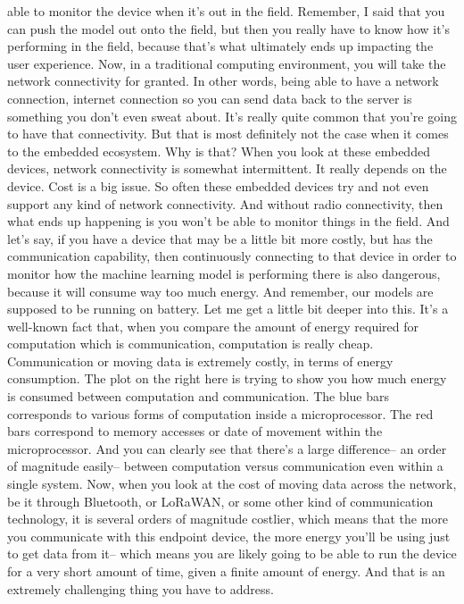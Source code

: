 able to monitor the device when it's out in the field.
Remember, I said that you can push the model out onto the field,
but then you really have to know how it's performing in the field,
because that's what ultimately ends up impacting the user experience.
Now, in a traditional computing environment,
you will take the network connectivity for granted.
In other words, being able to have a network connection, internet connection
so you can send data back to the server is
something you don't even sweat about.
It's really quite common that you're going to have that connectivity.
But that is most definitely not the case when
it comes to the embedded ecosystem.
Why is that?
When you look at these embedded devices, network connectivity
is somewhat intermittent.
It really depends on the device.
Cost is a big issue.
So often these embedded devices try and not even support
any kind of network connectivity.
And without radio connectivity, then what ends up happening
is you won't be able to monitor things in the field.
And let's say, if you have a device that may be a little bit more costly,
but has the communication capability, then continuously connecting
to that device in order to monitor how the machine learning model is
performing there is also dangerous, because it
will consume way too much energy.
And remember, our models are supposed to be running on battery.
Let me get a little bit deeper into this.
It's a well-known fact that, when you compare
the amount of energy required for computation which is communication,
computation is really cheap.
Communication or moving data is extremely costly,
in terms of energy consumption.
The plot on the right here is trying to show you
how much energy is consumed between computation and communication.
The blue bars corresponds to various forms
of computation inside a microprocessor.
The red bars correspond to memory accesses or date of movement
within the microprocessor.
And you can clearly see that there's a large difference--
an order of magnitude easily-- between computation versus communication
even within a single system.
Now, when you look at the cost of moving data across the network,
be it through Bluetooth, or LoRaWAN, or some other kind of communication
technology, it is several orders of magnitude costlier, which
means that the more you communicate with this endpoint device,
the more energy you'll be using just to get data from it--
which means you are likely going to be able to run
the device for a very short amount of time, given a finite amount of energy.
And that is an extremely challenging thing you have to address.
